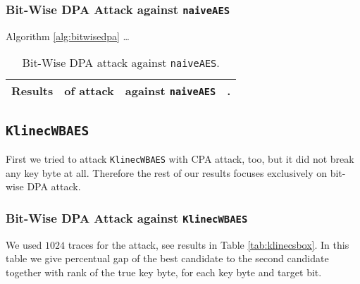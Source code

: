 \subsubsection{Bit-Wise DPA Attack against {\tt naiveAES}}
	
	Algorithm \ref{alg:bitwisedpa} \ldots
	
	\begin{table}[H]
		\begin{center}
		\begin{tabular}{| c | c | c | c |}
			\hline
			Results & of attack & against {\tt naiveAES} & . \\
			\hline
		\end{tabular}
		\end{center}
	\caption{Bit-Wise DPA attack against {\tt naiveAES}.}
	\label{tab:naiveaesdca}
	\end{table}



\subsection{\tt KlinecWBAES}
\label{sec:klinecwbaes}

First we tried to attack {\tt KlinecWBAES} with CPA attack, too, but it did not break any key byte at all. Therefore the rest of our results focuses exclusively on bit-wise DPA attack.

\subsubsection{Bit-Wise DPA Attack against {\tt KlinecWBAES}}
	
	We used $1024$ traces for the attack, see results in Table \ref{tab:klinecsbox}. In this table we give percentual gap of the best candidate to the second candidate together with rank of the true key byte, for each key byte and target bit.
	
	
